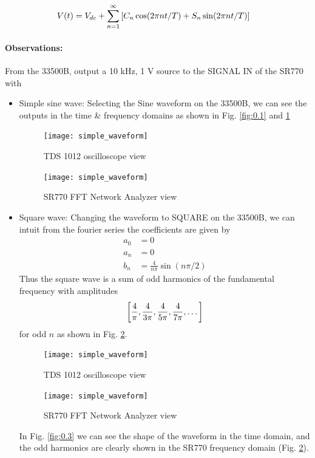 \documentclass[../main.tex]{subfiles}
\begin{document}
\begin{align}
    V(t) &= V_{dc} + \sum_{n=1}^\infty \qt[C_n \cos(2\pi n t/T) + S_n \sin(2\pi n t/T)]
\end{align}
\paragraph*{Observations:}

From the 33500B, output a 10 kHz, 1 V source to the SIGNAL IN of the SR770 with 
\begin{itemize}
    \item Simple sine wave: Selecting the Sine waveform on the 33500B, we can see the outputs in the time \& frequency domains
    as shown in Fig. \ref{fig:0.1} and \ref{fig:0.2}
    \begin{figure}[ht]
        \centering
        \begin{minipage}{0.5\textwidth}
            \centering
            \texttt{[image: simple\_waveform]}
            \caption{TDS 1012 oscilloscope view}
            \label{fig:0.1}
        \end{minipage}\hfill
        \begin{minipage}{0.5\textwidth}
            \centering
            \texttt{[image: simple\_waveform]}
            \caption{SR770 FFT Network Analyzer view}
            \label{fig:0.2}
        \end{minipage}
    \end{figure}
    \newpage
    \item Square wave: Changing the waveform to SQUARE on the 33500B, we can intuit from the fourier series the coefficients are given by
    \begin{align*}
        a_0 &= 0 \\
        a_n &= 0 \\
        b_n &= \frac{4}{n\pi} \sin(n\pi/2)
    \end{align*}
    Thus the square wave is a sum of odd harmonics of the fundamental frequency with amplitudes
    \begin{align*}
        \qt[\frac{4}{\pi}, \frac{4}{3\pi}, \frac{4}{5\pi}, \frac{4}{7\pi}, \dots]
    \end{align*}
    for odd $n$ as shown in Fig. \ref{fig:0.4}.
    \begin{figure}[ht]
        \centering
        \begin{minipage}{0.5\textwidth}
            \centering
            \texttt{[image: simple\_waveform]}
            \caption{TDS 1012 oscilloscope view}
            \label{fig:0.3}
        \end{minipage}\hfill
        \begin{minipage}{0.5\textwidth}
            \centering
            \texttt{[image: simple\_waveform]}
            \caption{SR770 FFT Network Analyzer view}
            \label{fig:0.4}
        \end{minipage}
    \end{figure}
    In Fig. \ref{fig:0.3} we can see the shape of the waveform in the time domain,
    and the odd harmonics are clearly shown in the SR770 frequency domain (Fig. \ref{fig:0.4}). 


\end{itemize}
\end{document}
